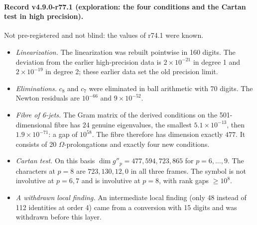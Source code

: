 \paragraph{Record v4.9.0-r77.1 (exploration: the four conditions and the Cartan test in high precision).}
Not pre-registered and not blind: the values of r74.1 were known.
\begin{itemize}[leftmargin=2em]
\item \emph{Linearization.}  The linearization was rebuilt pointwise in 160 digits.  The deviation from the earlier
high-precision data is \(2\times10^{-21}\) in degree 1 and \(2\times10^{-19}\) in degree 2; these earlier data set the old
precision limit.
\item \emph{Eliminations.}  \(c_8\) and \(c_7\) were eliminated in ball arithmetic with 70 digits.  The Newton residuals are
\(10^{-66}\) and \(9\times10^{-52}\).
\item \emph{Fibre of 6-jets.}  The Gram matrix of the derived conditions on the 501-dimensional fibre has 24 genuine
eigenvalues, the smallest \(5.1\times10^{-13}\), then \(1.9\times10^{-71}\): a gap of \(10^{58}\).  The fibre therefore has
dimension exactly \(477\).  It consists of 20 \(\Omega\)-prolongations and exactly four new conditions.
\item \emph{Cartan test.}  On this basis \(\dim g''_p=477,594,723,865\) for \(p=6,\dots,9\).  The characters at \(p=8\) are
\(723,130,12,0\) in all three frames.  The symbol is not involutive at \(p=6,7\) and is involutive at \(p=8\), with rank
gaps \(\ge10^{8}\).
\item \emph{A withdrawn local finding.}  An intermediate local finding (only 48 instead of 112 identities at order 4) came
from a conversion with 15 digits and was withdrawn before this layer.
\end{itemize}

